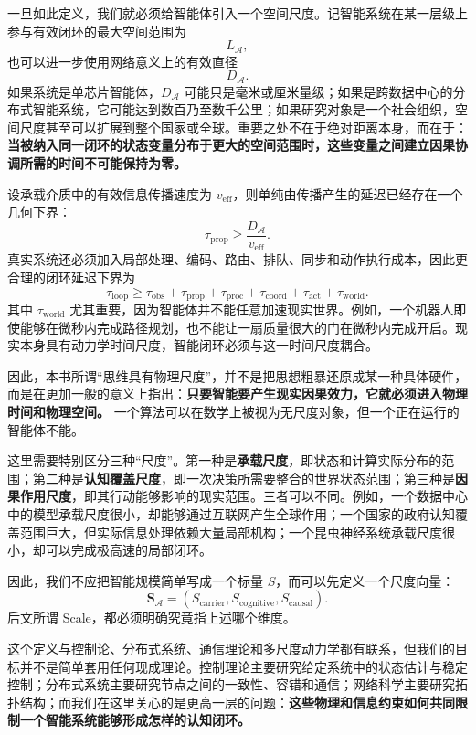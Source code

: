 一旦如此定义，我们就必须给智能体引入一个空间尺度。记智能系统在某一层级上参与有效闭环的最大空间范围为
\[
L_{\mathcal A},
\]
也可以进一步使用网络意义上的有效直径
\[
D_{\mathcal A}.
\]
如果系统是单芯片智能体，$D_{\mathcal A}$ 可能只是毫米或厘米量级；如果是跨数据中心的分布式智能系统，它可能达到数百乃至数千公里；如果研究对象是一个社会组织，空间尺度甚至可以扩展到整个国家或全球。重要之处不在于绝对距离本身，而在于：\textbf{当被纳入同一闭环的状态变量分布于更大的空间范围时，这些变量之间建立因果协调所需的时间不可能保持为零。}

设承载介质中的有效信息传播速度为 $v_{\mathrm{eff}}$，则单纯由传播产生的延迟已经存在一个几何下界：
\[
\tau_{\mathrm{prop}}
\geq
\frac{D_{\mathcal A}}{v_{\mathrm{eff}}}.
\]
真实系统还必须加入局部处理、编码、路由、排队、同步和动作执行成本，因此更合理的闭环延迟下界为
\[
\boxed{
\tau_{\mathrm{loop}}
\geq
\tau_{\mathrm{obs}}
+
\tau_{\mathrm{prop}}
+
\tau_{\mathrm{proc}}
+
\tau_{\mathrm{coord}}
+
\tau_{\mathrm{act}}
+
\tau_{\mathrm{world}}.
}
\]
其中 $\tau_{\mathrm{world}}$ 尤其重要，因为智能体并不能任意加速现实世界。例如，一个机器人即使能够在微秒内完成路径规划，也不能让一扇质量很大的门在微秒内完成开启。现实本身具有动力学时间尺度，智能闭环必须与这一时间尺度耦合。

因此，本书所谓“思维具有物理尺度”，并不是把思想粗暴还原成某一种具体硬件，而是在更加一般的意义上指出：\textbf{只要智能要产生现实因果效力，它就必须进入物理时间和物理空间。} 一个算法可以在数学上被视为无尺度对象，但一个正在运行的智能体不能。

这里需要特别区分三种“尺度”。第一种是\textbf{承载尺度}，即状态和计算实际分布的范围；第二种是\textbf{认知覆盖尺度}，即一次决策所需要整合的世界状态范围；第三种是\textbf{因果作用尺度}，即其行动能够影响的现实范围。三者可以不同。例如，一个数据中心中的模型承载尺度很小，却能够通过互联网产生全球作用；一个国家的政府认知覆盖范围巨大，但实际信息处理依赖大量局部机构；一个昆虫神经系统承载尺度很小，却可以完成极高速的局部闭环。

因此，我们不应把智能规模简单写成一个标量 $S$，而可以先定义一个尺度向量：
\[
\boxed{
\mathbf S_{\mathcal A}
=
\left(
S_{\mathrm{carrier}},
S_{\mathrm{cognitive}},
S_{\mathrm{causal}}
\right).
}
\]
后文所谓 Scale，都必须明确究竟指上述哪个维度。

这个定义与控制论、分布式系统、通信理论和多尺度动力学都有联系，但我们的目标并不是简单套用任何现成理论。控制理论主要研究给定系统中的状态估计与稳定控制；分布式系统主要研究节点之间的一致性、容错和通信；网络科学主要研究拓扑结构；而我们在这里关心的是更高一层的问题：\textbf{这些物理和信息约束如何共同限制一个智能系统能够形成怎样的认知闭环。}

